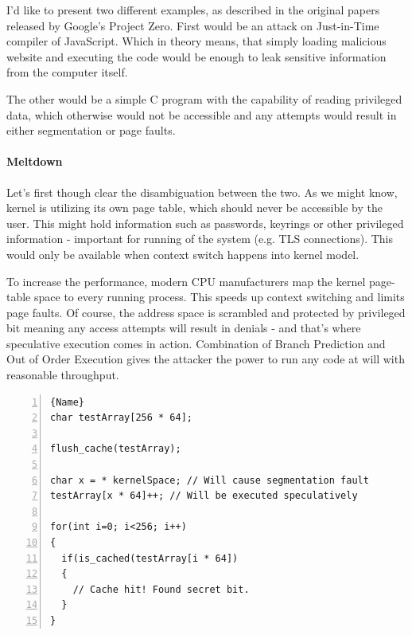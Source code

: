 \documentclass{article}
\begin{document}
I'd like to present two different examples, as described in the original papers\cite{kocher2018spectre}\cite{lipp2018meltdown} released by Google's Project Zero. First would be an attack on Just-in-Time compiler of JavaScript. Which in theory means, that simply loading malicious website and executing the code would be enough to leak sensitive information from the computer itself.

The other would be a simple C program with the capability of reading privileged data, which otherwise would not be accessible and any attempts would result in either segmentation or page faults.

\paragraph{Meltdown}
Let's first though clear the disambiguation between the two. As we might know, kernel is utilizing its own page table, which should never be accessible by the user. This might hold information such as passwords, keyrings or other privileged information - important for running of the system (e.g. TLS connections). This would only be available when context switch happens into kernel model.

To increase the performance, modern CPU manufacturers map the kernel page-table space to every running process. This speeds up context switching and limits page faults. Of course, the address space is scrambled and protected by privileged bit meaning any access attempts will result in denials - and that's where speculative execution comes in action. Combination of Branch Prediction and Out of Order Execution gives the attacker the power to run any code at will with reasonable throughput.

\pagebreak
\begin{lstlisting}[caption=Speculative execution,frame=tlrb, numbers=left, firstnumber=1]{Name}
char testArray[256 * 64];

flush_cache(testArray);

char x = * kernelSpace; // Will cause segmentation fault
testArray[x * 64]++; // Will be executed speculatively

for(int i=0; i<256; i++)
{
  if(is_cached(testArray[i * 64])
  {
    // Cache hit! Found secret bit.
  }
}
\end{lstlisting}
\end{document}
